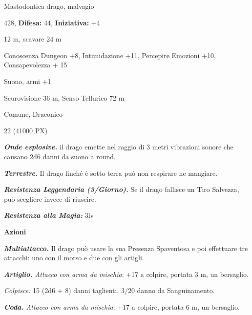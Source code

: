 \begin{multicols}{2}
{
\noindent
\begin{description}[noitemsep, topsep=0pt, parsep=0pt, partopsep=0pt, leftmargin=0cm, labelwidth=2.2cm]
	\item[\textbf{Taglia/Tipo:}] Mastodontica drago, malvagio
	\item[\textbf{Caratt.:}] 
	\item[\textbf{Punti Ferita:}] 428,  \textbf{Difesa:} 44,  \textbf{Iniziativa:} +4
	\item[\textbf{Movimento:}] 12 m, scavare 24 m
	\item[\textbf{Tiri Salvez.:}] 
	\item[\textbf{Comp.:}] Conoscenza Dungeon +8, Intimidazione +11, Percepire Emozioni +10, Consapevolezza + 15
	\item[\textbf{Imm. Danni:}] Suono, armi +1
	\item[\textbf{Sensi:}] Scurovisione 36 m, Senso Tellurico 72 m
	\item[\textbf{Linguaggi:}] Comune, Draconico
	\item[\textbf{Sfida:}] 22 (41000 PX)\smallskip
\end{description}

\emph{\textbf{Onde esplosive.}} il drago emette nel raggio di 3 metri vibrazioni sonore che causano 2d6 danni da suono a round.

\emph{\textbf{Terrestre.}} Il drago finché è sotto terra può non respirare ne mangiare.

\emph{\textbf{Resistenza Leggendaria (3/Giorno).}} Se il drago fallisce un Tiro Salvezza, può scegliere invece di riuscire.

\emph{\textbf{Resistenza alla Magia:}} 3lv

\textbf{Azioni}

\emph{\textbf{Multiattacco.}} Il drago può usare la sua Presenza Spaventosa e poi effettuare tre attacchi: uno con il morso e due con gli artigli.

\emph{\textbf{Artiglio.} Attacco con arma da mischia}: +17 a colpire, portata 3 m, un bersaglio.

\emph{Colpisce:} 15 (2d6 + 8) danni taglienti, 3/20 danno da Sanguinamento.

\emph{\textbf{Coda.} Attacco con arma da mischia}: +17 a colpire, portata 6 m, un bersaglio.

}
\end{multicols}
